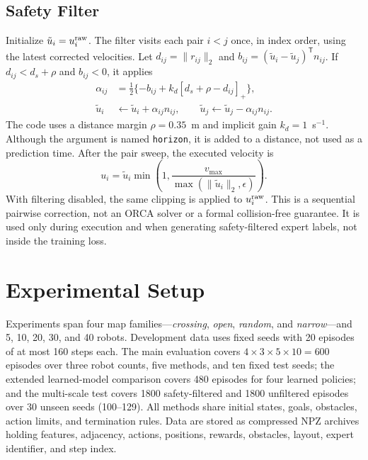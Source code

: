 \documentclass[conference]{IEEEtran}
\begin{document}
\subsection{Safety Filter}
Initialize $\tilde u_i=u_i^{\rm raw}$. The filter visits each pair $i<j$
once, in index order, using the latest corrected velocities. Let
$d_{ij}=\|r_{ij}\|_2$ and $b_{ij}=(\tilde u_i-\tilde u_j)^{\mathsf T}n_{ij}$.
If $d_{ij}<d_s+\rho$ and $b_{ij}<0$, it applies
\begin{equation}
\begin{aligned}
\alpha_{ij}&=\tfrac12\{-b_{ij}+k_d[d_s+\rho-d_{ij}]_+\},\\
\tilde u_i&\leftarrow\tilde u_i+\alpha_{ij}n_{ij},\qquad
\tilde u_j\leftarrow\tilde u_j-\alpha_{ij}n_{ij}.
\end{aligned}
\end{equation}
The code uses a distance margin $\rho=0.35$~m and implicit gain
$k_d=1$~s$^{-1}$. Although the argument is named \texttt{horizon}, it is
added to a distance, not used as a prediction time. After the pair sweep,
the executed velocity is
\begin{equation}
u_i=\tilde u_i\min\!\left(1,\frac{v_{\max}}{\max(\|\tilde u_i\|_2,\epsilon)}\right).
\end{equation}
With filtering disabled, the same clipping is applied to $u_i^{\rm raw}$.
This is a sequential pairwise correction, not an ORCA solver or a formal
collision-free guarantee. It is used only during execution and when
generating safety-filtered expert labels, not inside the training loss.

\section{Experimental Setup}

Experiments span four map families---\textit{crossing}, \textit{open},
\textit{random}, and \textit{narrow}---and 5, 10, 20, 30, and 40 robots.
Development data uses fixed seeds with 20 episodes of at most 160 steps each.
The main evaluation covers $4\times3\times5\times10=600$ episodes over
three robot counts, five methods, and ten fixed test seeds; the extended
learned-model comparison covers 480 episodes for four learned policies; and
the multi-scale test covers 1800 safety-filtered and 1800 unfiltered episodes
over 30 unseen seeds (100--129). All methods share initial states, goals,
obstacles, action limits, and termination rules. Data are stored as compressed
NPZ archives holding features, adjacency, actions, positions, rewards,
obstacles, layout, expert identifier, and step index.
\end{document}
